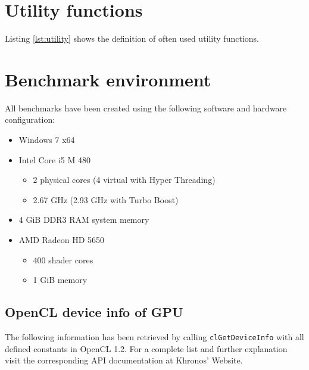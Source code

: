 
\chapter{Utility functions}
\label{sec:utility_functions}

Listing \ref{lst:utility} shows the definition of often used utility functions.




\chapter{Benchmark environment}
\label{sec:becnhmark_env}

All benchmarks have been created using the following software and hardware configuration:

\begin{itemize}
	\item Windows 7 x64
	\item Intel Core i5 M 480
	\begin{itemize}
		\item 2 physical cores (4 virtual with Hyper Threading)
		\item 2.67 GHz (2.93 GHz with Turbo Boost)
	\end{itemize}
	\item 4 GiB DDR3 RAM system memory
	\item AMD Radeon HD 5650
	\begin{itemize}
		\item 400 shader cores
		\item 1 GiB memory
	\end{itemize}
\end{itemize}

\section*{OpenCL device info of GPU}

The following information has been retrieved by calling \lstinline!clGetDeviceInfo! with all defined constants in OpenCL 1.2. For a complete list and further explanation visit the corresponding API documentation at Khronos' Website.

